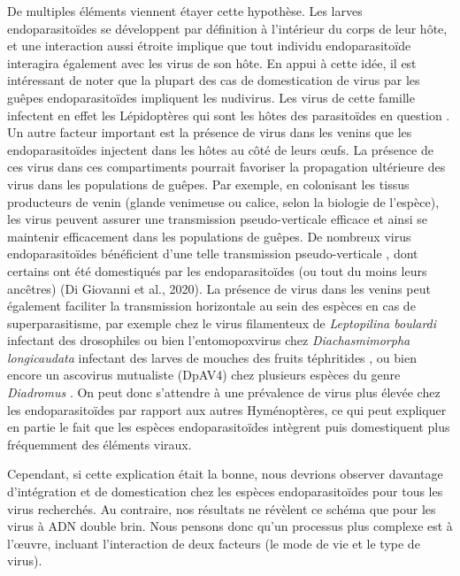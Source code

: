 De multiples éléments viennent étayer cette hypothèse. Les larves endoparasitoïdes se développent par définition à l'intérieur du corps de leur hôte, et une interaction aussi étroite implique que tout individu endoparasitoïde interagira également avec les virus de son hôte. En appui à cette idée, il est intéressant de noter que la plupart des cas de domestication de virus par les  guêpes endoparasitoïdes impliquent les nudivirus. Les virus de cette famille infectent en effet les Lépidoptères qui sont les hôtes des parasitoïdes en question \citep{burke_rapid_2018,pichon_recurrent_2015,bezier_polydnaviruses_2009-1}. Un autre facteur important est la présence de virus dans les venins que les endoparasitoïdes injectent dans les hôtes au côté de leurs œufs. La présence de ces virus dans ces compartiments pourrait favoriser la propagation ultérieure des virus dans les populations de guêpes. Par exemple, en colonisant les tissus producteurs de venin (glande venimeuse ou calice, selon la biologie de l'espèce), les virus peuvent assurer une transmission pseudo-verticale efficace et ainsi se maintenir efficacement dans les populations de guêpes. De nombreux virus endoparasitoïdes bénéficient d'une telle transmission pseudo-verticale \citep{varaldi_artifical_2006,renault_cypovirus_2003,coffman_viral_2022}, dont certains ont été domestiqués par les endoparasitoïdes (ou tout du moins leurs ancêtres) (Di Giovanni et al., 2020). La présence de virus dans les venins peut également faciliter la transmission horizontale au sein des espèces en cas de superparasitisme, par exemple chez le virus filamenteux de \textit{Leptopilina boulardi} infectant des drosophiles \citep{varaldi_infectious_2003} ou bien l'entomopoxvirus chez \textit{Diachasmimorpha longicaudata} infectant des larves de mouches des fruits téphritides \citep{coffman_viral_2022}, ou bien encore un ascovirus mutualiste (DpAV4) chez plusieurs espèces du genre \textit{Diadromus} \citep{stasiak_characteristics_2005}. On peut donc s'attendre à une prévalence de virus plus élevée  chez les endoparasitoïdes par rapport aux autres Hyménoptères, ce qui peut expliquer en partie le fait que les espèces endoparasitoïdes intègrent puis domestiquent plus fréquemment des éléments viraux. 

Cependant, si cette explication était la bonne, nous devrions observer davantage d'intégration et de domestication chez les espèces endoparasitoïdes pour tous les virus recherchés. Au contraire, nos résultats ne révèlent ce schéma que pour les virus à ADN double brin. Nous pensons donc qu'un processus plus complexe est à l'œuvre, incluant l'interaction de deux facteurs (le mode de vie et le type de virus). \\

